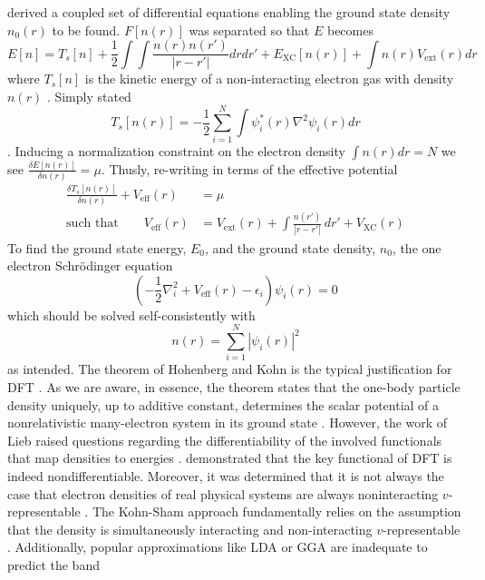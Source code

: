 \documentclass[10pt]{article}
\begin{document}
\citet{kohn1965self} derived a coupled set of differential equations enabling the ground state density $n_0({r})$ to be found. $F[n(r)]$ was separated so that $E$ becomes
\begin{equation}
E[n] = T_s[n] + \frac{1}{2} \int \int \frac{n(r) n(r')}{|r-r'|} dr dr' + E_{\text{XC}}[n(r)] + \int n(r) V_{\text{ext}}(r) dr
\end{equation}
where $T_s[n]$ is the kinetic energy of a non-interacting electron gas with density $n({r})$ \citep{kent1999techniques,kohn1999nobel}. Simply stated
\begin{equation}
T_s[n(r)] = -\frac{1}{2}\sum_{i=1}^N \int \psi_i^{\ast}(r) \nabla^2 \psi_i(r) dr
\end{equation}.
Inducing a normalization constraint on the electron density $\int n(r) dr = N$ we see $\frac{\delta E[n(r)]}{\delta n(r)} = \mu$. Thusly, re-writing in terms of the effective potential
\begin{equation}
\begin{aligned}
\frac{\delta T_s[n(r)]}{\delta n(r)} + V_{\text{eff}}(r) &= \mu \\
\text{such that} \qquad
V_{\text{eff}}(r) &= V_{\text{ext}}(r)
+ \int \frac{n(r')}{|r - r'|}\,dr'
+ V_{\text{XC}}(r)
\end{aligned}
\end{equation}
To find the ground state energy, $E_{0}$, and the ground state density, $n_0$, the one electron Schrödinger equation
\begin{equation}
\left( -\frac{1}{2} \nabla^2_i + V_{\text{eff}}(r) - \epsilon_i \right)\psi_i(r) = 0
\end{equation}
which should be solved self-consistently with 
\begin{equation}
n(r) = \sum_{i=1}^{N} |\psi_i(r)|^2
\end{equation}
as intended. The theorem of Hohenberg and Kohn is the typical justification for DFT \citep{penz2023structure}. As we are aware, in essence, the theorem states that the one-body particle density uniquely, up to additive constant, determines the scalar potential of a nonrelativistic many-electron system in its ground state \citep{penz2023structure,hohenberg1964inhomogeneous,kohn1999nobel}. However, the work of Lieb raised questions regarding the differentiability of the involved functionals that map densities to energies \citep{lieb2013current,lammert2007differentiability,penz2023structure}. \citet{lammert2007differentiability} demonstrated that the key functional of DFT is indeed nondifferentiable. Moreover, it was determined that it is not always the case that electron densities of real physical systems are always noninteracting $v$-representable \citep{trushin2024violations}. The Kohn-Sham approach fundamentally relies on the assumption that the density is simultaneously interacting and non-interacting $v$-representable \citep{sutter2024solution}. Additionally, popular approximations like LDA or GGA are inadequate to predict the band
\end{document}
